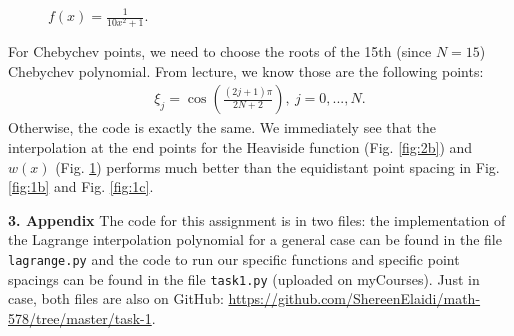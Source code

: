 \documentclass[11pt]{article}
\theoremstyle{definition}
\theoremstyle{theorem}
\begin{document}
\begin{figure}[H]
  \caption{\(f(x) = \frac{1}{10x^2 +1}. \)}\label{fig:2c}
\endminipage
\end{figure}
For Chebychev points, we need to choose the roots of the 15th (since \( N = 15 \)) Chebychev polynomial. From lecture, we know those are the following points: 
\begin{align}
	\xi_j = \cos \left(  \frac{(2j + 1) \pi}{2N + 2} \right),\ j =0, ..., N.	
\end{align}
Otherwise, the code is exactly the same. We immediately see that the interpolation at the end points for the Heaviside function (Fig. \ref{fig:2b}) and \( w(x) \) (Fig. \ref{fig:2c}) performs much better than the equidistant point spacing in Fig. \ref{fig:1b} and Fig. \ref{fig:1c}. 

\textbf{3. Appendix}
\newline
The code for this assignment is in two files: the implementation of the Lagrange interpolation polynomial for a general case can be found in the file \texttt{lagrange.py} and the code to run our specific functions and specific point spacings can be found in the file \texttt{task1.py} (uploaded on myCourses). Just in case, both files are also on GitHub: \url{https://github.com/ShereenElaidi/math-578/tree/master/task-1}.
\end{document}
